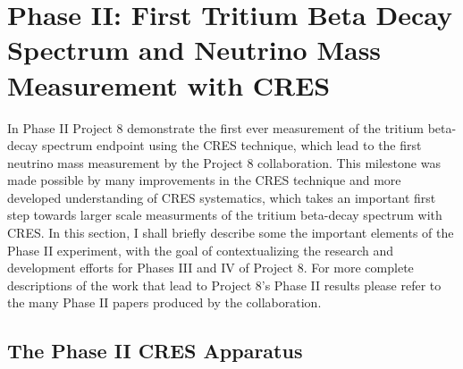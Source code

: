 \cleardoublepage


\section{Phase II: First Tritium Beta Decay Spectrum and Neutrino Mass Measurement with CRES}

In Phase II Project 8 demonstrate the first ever measurement of the tritium beta-decay spectrum endpoint using the CRES technique, which lead to the first neutrino mass measurement by the Project 8 collaboration. This milestone was made possible by many improvements in the CRES technique and more developed understanding of CRES systematics, which takes an important first step towards larger scale measurments of the tritium beta-decay spectrum with CRES. In this section, I shall briefly describe some the important elements of the Phase II experiment, with the goal of contextualizing the research and development efforts for Phases III and IV of Project 8. For more complete descriptions of the work that lead to Project 8's Phase II results please refer to the many Phase II papers produced by the collaboration.

\subsection{The Phase II CRES Apparatus}

